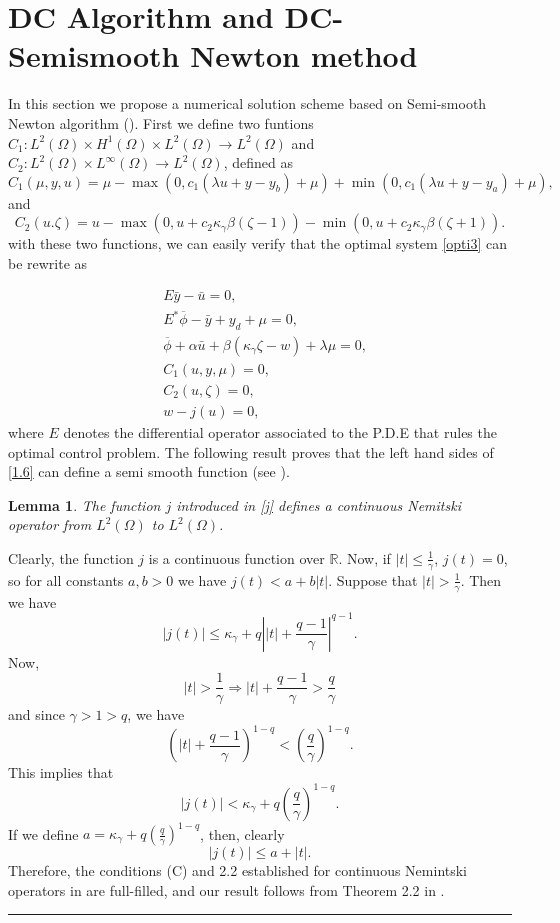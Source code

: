 \documentclass[11pt,a4paper]{amsart}
\newcommand{\kw}{\rule{2mm}{2mm}}
\renewcommand{\l}{\left}
\renewcommand{\r}{\right}
\newcommand{\om}{\Omega}
\newcommand{\reals}{\mathbb{R}}
\renewenvironment{proof}{{Proof.}}{\hfill\kw}
\newtheorem{lemma}{{Lemma}}
\newcommand{\subtag}[1]{\tag{\theparentequation#1}}
\begin{document}
\section{DC Algorithm and DC-Semismooth Newton method}

In this section we propose a numerical solution scheme based on Semi-smooth Newton algorithm (\cite{merino1, ulbrich}). First we define two funtions $C_1:L^2(\om)\times H^{1}(\om)\times L^2(\om)\to L^2(\om)$ and $C_2:L^2(\om)\times L^{\infty}(\om)\to L^2(\om)$, defined as
\[
    C_{1}(\mu,y,u)=\mu-\max(0,c_1(\lambda u+y-y_b)+\mu)+\min(0,c_1(\lambda u+y-y_a)+\mu),
\]
and
\[
C_{2}(u.\zeta)=u-\max(0,u+c_2\kappa_{\gamma}\beta(\zeta-1))-\min(0,u+c_2\kappa_{\gamma}\beta(\zeta+1)).
\]
with these two functions, we can easily verify that the optimal system \eqref{opti3} can be rewrite as

\begin{subequations}\label{1.6}
\begin{align}
    &E\bar{y}-\bar{u}=0,\subtag{a}\\
    &E^*\overline{\phi}-\bar{y}+y_d+\mu=0,\subtag{b}\\
    &\overline{\phi}+\alpha \bar{u}+\beta (\kappa_{\gamma}\zeta-w)+\lambda \mu=0,\subtag{c}\\
    &C_1(u,y,\mu)=0,\subtag{d}\\
    &C_2(u,\zeta)=0,\subtag{e}\\
    &w-j(u)=0,\subtag{f}
\end{align}
\end{subequations}
where $E$ denotes the differential operator associated to the P.D.E that rules the optimal control problem. The following result proves that the left hand sides of \eqref{1.6} can define a semi smooth function (see \cite{ulbrich}).

\begin{lemma}
The function $j$ introduced in \eqref{j} defines a continuous Nemitski  operator from $L^2(\om)$ to $L^2(\om)$.
\end{lemma}

\begin{proof}
Clearly, the function $j$ is a continuous function over $\reals$. Now, if $|t|\le \frac{1}{\gamma}$, $j(t)=0$, so for all constants $a,b>0$ we have $j(t)<a+b|t|$. Suppose that $|t|>\frac{1}{\gamma}$. Then we have
\[
    |j(t)|\le \kappa_{\gamma} +q\l||t|+\frac{q-1}{\gamma}\r|^{q-1}.
\]
Now,
\[
|t|>\frac{1}{\gamma}\Rightarrow |t|+\frac{q-1}{\gamma}>\frac{q}{\gamma}
\]
and since $\gamma>1>q$, we have
\[
    \l(|t|+\frac{q-1}{\gamma}\r)^{1-q}<\l(\frac{q}{\gamma}\r)^{1-q}.
\]
This implies that
\[
|j(t)|<\kappa_{\gamma}+q\l(\frac{q}{\gamma}\r)^{1-q}.
\]
If we define $a=\kappa_{\gamma}+q\l(\frac{q}{\gamma}\r)^{1-q}$, then, clearly
\[
|j(t)|\le a+|t|.
\]
Therefore, the conditions (C) and 2.2 established for continuous Nemintski operators in \cite{ambrosetti} are full-filled, and our result follows from Theorem 2.2 in \cite{ambrosetti}. 
\end{proof}
\end{document}
